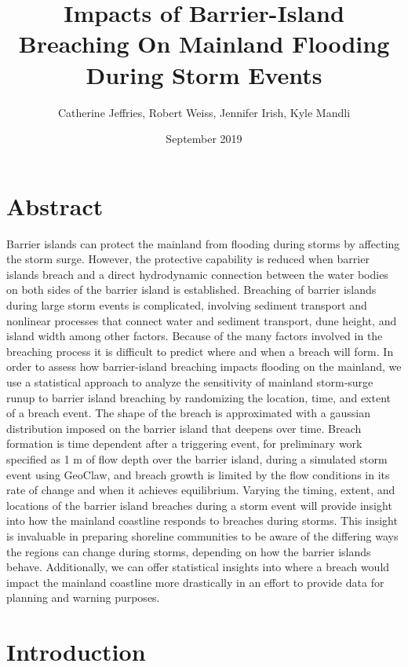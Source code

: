\documentclass{article}
\title{Impacts of Barrier-Island Breaching On Mainland Flooding During Storm Events}
\author{Catherine Jeffries, Robert Weiss, Jennifer Irish, Kyle Mandli}
\date{September 2019}
\begin{document}
\maketitle

\section{Abstract}
Barrier islands can protect the mainland from flooding during storms by affecting the storm
surge. However, the protective capability is reduced when barrier islands breach and a direct
hydrodynamic connection between the water bodies on both sides of the barrier island is
established. Breaching of barrier islands during large storm events is complicated, involving
sediment transport and nonlinear processes that connect water and sediment transport, dune
height, and island width among other factors. Because of the many factors involved in the
breaching process it is difficult to predict where and when a breach will form. In order to
assess how barrier-island breaching impacts flooding on the mainland, we use a statistical
approach to analyze the sensitivity of mainland storm-surge runup to barrier island breaching
by randomizing the location, time, and extent of a breach event. The shape of the breach is
approximated with a gaussian distribution imposed on the barrier island that deepens over
time. Breach formation is time dependent after a triggering event, for preliminary work
specified as 1 m of flow depth over the barrier island, during a simulated storm event using
GeoClaw, and breach growth is limited by the flow conditions in its rate of change and when it
achieves equilibrium. Varying the timing, extent, and locations of the barrier island breaches
during a storm event will provide insight into how the mainland coastline responds to breaches
during storms. This insight is invaluable in preparing shoreline communities to be aware of the
differing ways the regions can change during storms, depending on how the barrier islands
behave. Additionally, we can offer statistical insights into where a breach would impact the
mainland coastline more drastically in an effort to provide data for planning and warning
purposes.

\section{Introduction}
\end{document}
